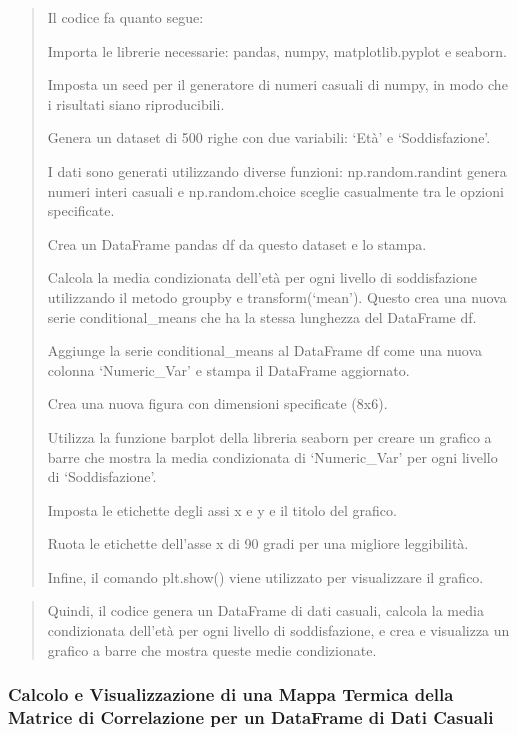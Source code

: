 \documentclass[11pt]{article}
\begin{document}
    \begin{quote}
Il codice fa quanto segue:

Importa le librerie necessarie: pandas, numpy, matplotlib.pyplot e
seaborn.

Imposta un seed per il generatore di numeri casuali di numpy, in modo
che i risultati siano riproducibili.

Genera un dataset di 500 righe con due variabili: `Età' e
`Soddisfazione'.

I dati sono generati utilizzando diverse funzioni: np.random.randint
genera numeri interi casuali e np.random.choice sceglie casualmente tra
le opzioni specificate.

Crea un DataFrame pandas df da questo dataset e lo stampa.

Calcola la media condizionata dell'età per ogni livello di soddisfazione
utilizzando il metodo groupby e transform(`mean'). Questo crea una nuova
serie conditional\_means che ha la stessa lunghezza del DataFrame df.

Aggiunge la serie conditional\_means al DataFrame df come una nuova
colonna `Numeric\_Var' e stampa il DataFrame aggiornato.

Crea una nuova figura con dimensioni specificate (8x6).

Utilizza la funzione barplot della libreria seaborn per creare un
grafico a barre che mostra la media condizionata di `Numeric\_Var' per
ogni livello di `Soddisfazione'.

Imposta le etichette degli assi x e y e il titolo del grafico.

Ruota le etichette dell'asse x di 90 gradi per una migliore leggibilità.

Infine, il comando plt.show() viene utilizzato per visualizzare il
grafico.
\end{quote}

\begin{quote}
Quindi, il codice genera un DataFrame di dati casuali, calcola la media
condizionata dell'età per ogni livello di soddisfazione, e crea e
visualizza un grafico a barre che mostra queste medie condizionate.
\end{quote}

    \subsubsection{Calcolo e Visualizzazione di una Mappa Termica della
Matrice di Correlazione per un DataFrame di Dati
Casuali}\label{calcolo-e-visualizzazione-di-una-mappa-termica-della-matrice-di-correlazione-per-un-dataframe-di-dati-casuali}
\end{document}
